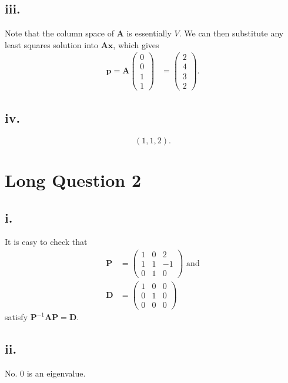 \documentclass{article}
\begin{document}
\subsection*{iii.}
Note that the column space of $\mathbf{A}$ is essentially $V$. We can then substitute any least squares solution into $\mathbf{A}\mathbf{x}$, which gives
\begin{align*}
\mathbf{p} = \mathbf{A}\begin{pmatrix}
        0 \\
        0 \\
        1 \\
        1
    \end{pmatrix}
        &=\begin{pmatrix}
        2 \\
        4 \\
        3 \\
        2
    \end{pmatrix}.
\end{align*}
\subsection*{iv.}
\[(1,1,2).\]
\section*{Long Question 2}
\subsection*{i.}
It is easy to check that 
\begin{align*}
    \mathbf{P} &=
    \begin{pmatrix}
        1 & 0 & 2 \\
        1 & 1 & -1 \\
        0 & 1 & 0
    \end{pmatrix}\text{ and}\\
    \mathbf{D} &=
    \begin{pmatrix}
        1 & 0 & 0 \\
        0 & 1 & 0 \\
        0 & 0 & 0
    \end{pmatrix}
\end{align*}
satisfy $\mathbf{P}^{-1}\mathbf{A}\mathbf{P} = \mathbf{D}$.
\subsection*{ii.} 
No. 0 is an eigenvalue. 
\end{document}
